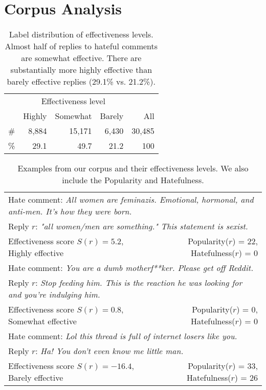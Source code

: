 \documentclass[11pt]{article}
\begin{document}
\section{Corpus Analysis} 
\label{s:corpus_analysis}

\begin{table}
	\centering
	\begin{tabular}{lrrrr}
		\toprule
		& \multicolumn{3}{c}{Effectiveness level} \\ \cmidrule{2-4} 
		\multicolumn{1}{c}{} & Highly & Somewhat & Barely & All \\
		\hline
		\addlinespace[1pt]
		\# & 8,884 & 15,171 & 6,430 & 30,485 \\ 
		\% & 29.1 & 49.7 & 21.2 & 100 \\
		\bottomrule
	\end{tabular}
	\caption{Label distribution of effectiveness levels.
		Almost half of replies to hateful comments are somewhat effective.
		There are substantially more highly effective than barely effective replies (29.1\% vs. 21.2\%).}
	\label{t:label-distribution}
\end{table}

\begin{table*}[t]
	\small
	\centering
	\begin{tabular}{lr}
		\toprule
		
		\multicolumn{2}{l}{Hate comment: \emph{All women are feminazis. Emotional, hormonal, %
				and anti-men. It's how they were born.}} \\
		\multicolumn{2}{l}{Reply $r$: \emph{"all women/men are something." This statement is sexist.}} \\ \addlinespace
		Effectiveness score $S(r) = 5.2$, Highly effective &
		Popularity($r$) = $22$, Hatefulness($r$) = $0$ \\ \midrule
		
		\multicolumn{2}{l}{Hate comment: \emph{You are a dumb motherf**ker. Please get off Reddit.}} \\
		\multicolumn{2}{l}{Reply $r$: \emph{Stop feeding him. This is the reaction he was looking for and you're indulging him.}} \\ \addlinespace
		Effectiveness score $S(r) = 0.8$, Somewhat effective & 
		Popularity($r$) = $0$, Hatefulness($r$) = $0$ \\ \midrule
		
		\multicolumn{2}{l}{Hate comment:\emph{ Lol this thread is full of internet losers like you.}} \\
		\multicolumn{2}{l}{Reply $r$: \emph{Ha! You don't even know me little man.}} \\ \addlinespace
		Effectiveness score $S(r) = -16.4$, Barely effective &
		Popularity($r$) = $33$, Hatefulness($r$) = $26$ \\ \bottomrule
	\end{tabular}
	
	\caption{Examples from our corpus and their effectiveness levels.
		We also include the Popularity and Hatefulness.}
	\label{t:corpus-examples}
\end{table*}
\end{document}
